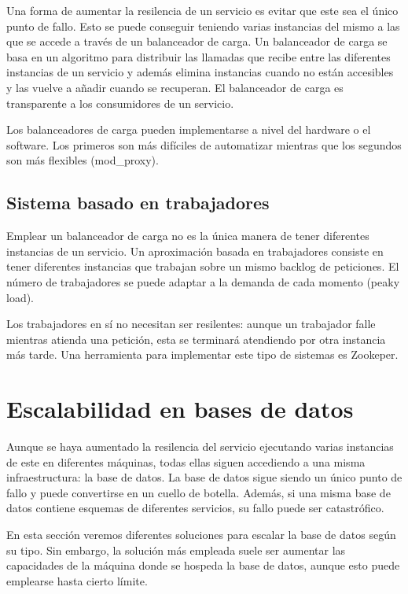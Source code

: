 \documentclass[11pt,a4paper]{article}
\begin{document}
Una forma de aumentar la resilencia de un servicio es evitar que este sea el único punto de fallo. Esto se puede conseguir teniendo varias instancias del mismo a las que se accede a través de un balanceador de carga. Un balanceador de carga se basa en un algoritmo para distribuir las llamadas que recibe entre las diferentes instancias de un servicio y además elimina instancias cuando no están accesibles y las vuelve a añadir cuando se recuperan. El balanceador de carga es transparente a los consumidores de un servicio.

Los balanceadores de carga pueden implementarse a nivel del hardware o el software. Los primeros son más difíciles de automatizar mientras que los segundos son más flexibles (mod\_proxy).

\subsection{Sistema basado en trabajadores}

Emplear un balanceador de carga no es la única manera de tener diferentes instancias de un servicio. Un aproximación basada en trabajadores consiste en tener diferentes instancias que trabajan sobre un mismo backlog de peticiones. El número de trabajadores se puede adaptar a la demanda de cada momento (peaky load). 

Los trabajadores en sí no necesitan ser resilentes: aunque un trabajador falle mientras atienda una petición, esta se terminará atendiendo por otra instancia más tarde. Una herramienta para implementar este tipo de sistemas es Zookeper.

\section{Escalabilidad en bases de datos}

Aunque se haya aumentado la resilencia del servicio ejecutando varias instancias de este en diferentes máquinas, todas ellas siguen accediendo a una misma infraestructura: la base de datos. La base de datos sigue siendo un único punto de fallo y puede convertirse en un cuello de botella. Además, si una misma base de datos contiene esquemas de diferentes servicios, su fallo puede ser catastrófico. 

En esta sección veremos diferentes soluciones para escalar la base de datos según su tipo. Sin embargo, la solución más empleada suele ser aumentar las capacidades de la máquina donde se hospeda la base de datos, aunque esto puede emplearse hasta cierto límite.
\end{document}
